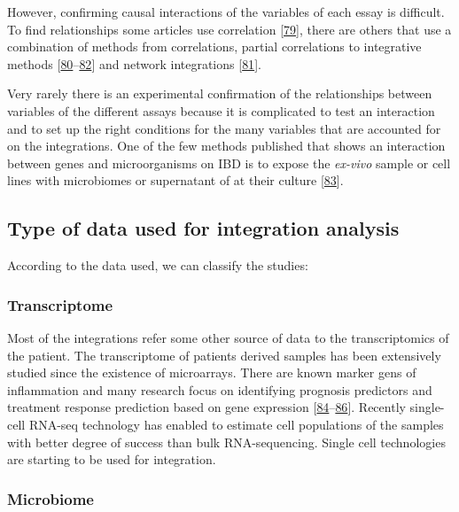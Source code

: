 \documentclass[
  12pt,
  a4paper,
  twoside,
  openright]{book}
\begin{document}
However, confirming causal interactions of the variables of each essay is difficult.
To find relationships some articles use correlation {[}\protect\hyperlink{ref-hasler_uncoupling_2016}{79}{]}, there are others that use a combination of methods from correlations, partial correlations to integrative methods {[}\protect\hyperlink{ref-tang2017}{80}--\protect\hyperlink{ref-huWholeExomeSequencing2021}{82}{]} and network integrations {[}\protect\hyperlink{ref-hernuxe1ndez-rocha2021}{81}{]}.

Very rarely there is an experimental confirmation of the relationships between variables of the different assays because it is complicated to test an interaction and to set up the right conditions for the many variables that are accounted for on the integrations.
One of the few methods published that shows an interaction between genes and microorganisms on IBD is to expose the \emph{ex-vivo} sample or cell lines with microbiomes or supernatant of at their culture {[}\protect\hyperlink{ref-mayorgas2021}{83}{]}.

\hypertarget{data-origin}{%
\subsection{Type of data used for integration analysis}\label{data-origin}}

According to the data used, we can classify the studies:

\hypertarget{transcriptome}{%
\subsubsection{Transcriptome}\label{transcriptome}}

Most of the integrations refer some other source of data to the transcriptomics of the patient.
The transcriptome of patients derived samples has been extensively studied since the existence of microarrays.
There are known marker gens of inflammation and many research focus on identifying prognosis predictors and treatment response prediction based on gene expression {[}\protect\hyperlink{ref-planell2013}{84}--\protect\hyperlink{ref-massimino2021}{86}{]}.
Recently single-cell RNA-seq technology has enabled to estimate cell populations of the samples with better degree of success than bulk RNA-sequencing.
Single cell technologies are starting to be used for integration.

\hypertarget{microbiome-1}{%
\subsubsection{Microbiome}\label{microbiome-1}}
\end{document}
